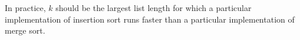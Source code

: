 In practice, $k$ should be the largest list length for which a particular implementation of insertion sort runs faster than a particular implementation of merge sort.
